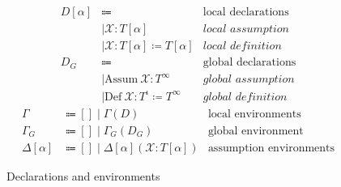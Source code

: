 \begin{figure}
\centering
\begin{align*}
D[\alpha] &\Coloneqq                                           &\text{local declarations} \\
    &\mid \mathcal{X}: T[\alpha]                               &\textit{local assumption} \\
    &\mid \mathcal{X}: T[\alpha] \coloneqq T[\alpha]           &\textit{local definition} \\
D_G &\Coloneqq                                                 &\text{global declarations} \\
    &\mid \text{Assum} \ \mathcal{X}: T^\infty                 &\textit{global assumption} \\
    &\mid \text{Def} \ \mathcal{X}: T^\iota \coloneqq T^\infty &\textit{global definition}
\end{align*}
\begin{align*}
\Gamma          &\Coloneqq [] \mid \Gamma (D)                  &\text{local environments} \\
\Gamma_G        &\Coloneqq [] \mid \Gamma_G (D_G)              &\text{global environment} \\
\Delta[\alpha]  &\Coloneqq [] \mid \Delta[\alpha] (\mathcal{X}: T[\alpha]) &\text{assumption environments}
\end{align*}
\caption{Declarations and environments}
\label{fig:contexts}
\end{figure}